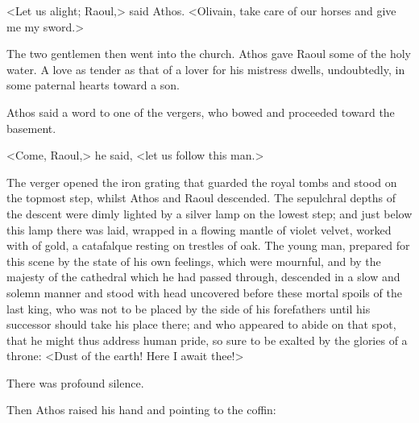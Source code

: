 <Let us alight; Raoul,> said Athos. <Olivain, take care of our horses and give me my sword.>

The two gentlemen then went into the church. Athos gave Raoul some of the holy water. A love as tender as that of a lover for his mistress dwells, undoubtedly, in some paternal hearts toward a son.

Athos said a word to one of the vergers, who bowed and proceeded toward the basement.

<Come, Raoul,> he said, <let us follow this man.>

The verger opened the iron grating that guarded the royal tombs and stood on the topmost step, whilst Athos and Raoul descended. The sepulchral depths of the descent were dimly lighted by a silver lamp on the lowest step; and just below this lamp there was laid, wrapped in a flowing mantle of violet velvet, worked with  of gold, a catafalque resting on trestles of oak. The young man, prepared for this scene by the state of his own feelings, which were mournful, and by the majesty of the cathedral which he had passed through, descended in a slow and solemn manner and stood with head uncovered before these mortal spoils of the last king, who was not to be placed by the side of his forefathers until his successor should take his place there; and who appeared to abide on that spot, that he might thus address human pride, so sure to be exalted by the glories of a throne: <Dust of the earth! Here I await thee!>

There was profound silence.

Then Athos raised his hand and pointing to the coffin:

